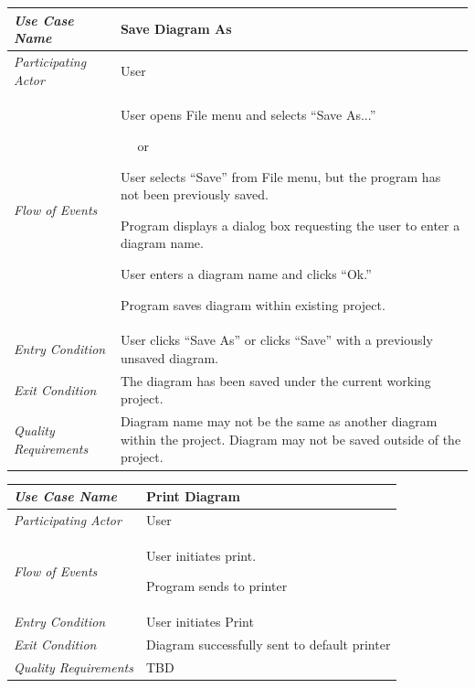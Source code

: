 \documentclass[twoside,letterpaper]{article}
\newenvironment{my_enumerate}{
\begin{enumerate}
  \setlength{\itemsep}{1pt}
  \setlength{\parskip}{0pt}
  \setlength{\parsep}{0pt}}{\end{enumerate}
}
\begin{document}
\begin{flushleft}
\tablehead{}
\begin{tabular}{|m{2.0in} m{5.0in}|}
\hline
{\bfseries\emph{Use Case Name}}
& {\bfseries Save Diagram As}
\\\hline
\emph{Participating Actor}
& User
\\\hline
\emph{Flow of Events}
& \begin{my_enumerate}
\item User opens File menu and selects ``Save As...''
\end{my_enumerate}
\ ~ or
\begin{my_enumerate}
\item User selects ``Save'' from File menu, but the program has not been previously saved.
\item Program displays a dialog box requesting the user to enter a diagram name.
\item User enters a diagram name and clicks ``Ok.''
\item Program saves diagram within existing project.
\end{my_enumerate}
\\\hline
\emph{Entry Condition}
& User clicks ``Save As'' or clicks ``Save'' with a previously unsaved diagram. 
\\\hline
\emph{Exit Condition}
& The diagram has been saved under the current working project.
\\\hline
\emph{Quality Requirements}
& Diagram name may not be the same as another diagram within the project. Diagram may not be saved outside of the project.
\\\hline
\end{tabular}
\end{flushleft}
\bigskip



\begin{flushleft}
\tablehead{}
\begin{tabular}{|m{2.0in} m{5.0in}|}
\hline
{\bfseries\emph{Use Case Name}}
& {\bfseries Print Diagram}
\\\hline
\emph{Participating Actor}
& User
\\\hline
\emph{Flow of Events}
& \begin{my_enumerate}
\item User initiates print. 
\item Program sends to printer
\end{my_enumerate}
\\\hline
\emph{Entry Condition}
& User initiates Print
\\\hline
\emph{Exit Condition}
& Diagram successfully sent to default printer
\\\hline
\emph{Quality Requirements}
& TBD
\\\hline
\end{tabular}
\end{flushleft}
\bigskip
\end{document}
